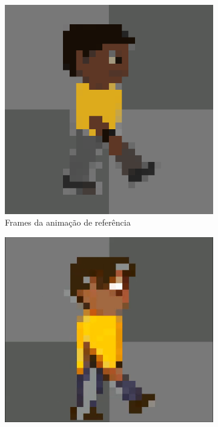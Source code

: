 \begin{figure}[htbp]
    \centering
    \caption{\small Comparação do sprite original com os frames da animação de base e da gerada no Pixel Lab}
    \label{fig:pixelLabAnimaCompara}

    \begin{subfigure}{0.32\linewidth}
        \includegraphics[width=0.9\linewidth]{figs/pixelLab/dia3/print0.PNG}
        \caption{\small Frames da animação de referência}
        \label{fig:pixelLabAnimaComparaAni}
    \end{subfigure}
    \begin{subfigure}{0.32\linewidth}
        \includegraphics[width=1\linewidth]{figs/pixelLab/dia3/print4.PNG}

\end{subfigure}
\end{figure}

